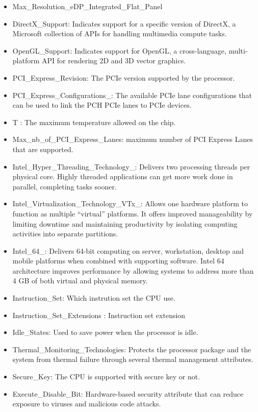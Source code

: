 \begin{itemize}
    \item Max\_Resolution\_eDP\_Integrated\_Flat\_Panel	
    \item DirectX\_Support: Indicates support for a specific version of DirectX, a Microsoft collection of APIs for handling multimedia compute tasks.
    \item OpenGL\_Support: Indicates support for OpenGL, a cross-language, multi-platform API for rendering 2D and 3D vector graphics. 
    \item PCI\_Express\_Revision: The PCIe version supported by the processor. 
    \item PCI\_Express\_Configurations\_: The available PCIe lane configurations that can be used to link the PCH PCIe lanes to PCIe devices.
    \item T : The maximum temperature allowed on the chip.
    \item Max\_nb\_of\_PCI\_Express\_Lanes: maximum number of PCI Express Lanes that are supported.
    \item Intel\_Hyper\_Threading\_Technology\_: Delivers two processing threads per physical core. Highly threaded applications can get more work done in parallel, completing tasks sooner.
    \item Intel\_Virtualization\_Technology\_VTx\_: Allows one hardware platform to function as multiple “virtual” platforms. It offers improved manageability by limiting downtime and maintaining productivity by isolating computing activities into separate partitions.
    \item Intel\_64\_: Delivers 64-bit computing on server, workstation, desktop and mobile platforms when combined with supporting software. Intel 64 architecture improves performance by allowing systems to address more than 4 GB of both virtual and physical memory.
    \item Instruction\_Set: Which instrution set the CPU use.
    \item Instruction\_Set\_Extensions :  Instruction set extension
    \item Idle\_States: Used to save power when the processor is idle.
    \item Thermal\_Monitoring\_Technologies: Protects the processor package and the system from thermal failure through several thermal management attributes.	
    \item Secure\_Key: The CPU is supported with secure key or not.
    \item Execute\_Disable\_Bit: Hardware-based security attribute that can reduce exposure to viruses and malicious code attacks.
\end{itemize}

